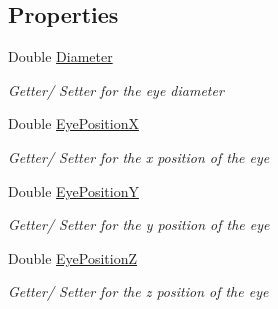 \subsection*{Properties}
\begin{DoxyCompactItemize}
\item 
Double \hyperlink{class_web_analyzer_1_1_models_1_1_data_model_1_1_eye_tracking_data_a52d26b6d84aa2b1fac4dc11e299b69d9}{Diameter}
\begin{DoxyCompactList}\small\item\em Getter/ Setter for the eye diameter \end{DoxyCompactList}\item 
Double \hyperlink{class_web_analyzer_1_1_models_1_1_data_model_1_1_eye_tracking_data_a872295614640947c4599c118311be629}{Eye\+Position\+X}
\begin{DoxyCompactList}\small\item\em Getter/ Setter for the x position of the eye \end{DoxyCompactList}\item 
Double \hyperlink{class_web_analyzer_1_1_models_1_1_data_model_1_1_eye_tracking_data_a4c90dacc2660f530e239c2dca2dddaea}{Eye\+Position\+Y}
\begin{DoxyCompactList}\small\item\em Getter/ Setter for the y position of the eye \end{DoxyCompactList}\item 
Double \hyperlink{class_web_analyzer_1_1_models_1_1_data_model_1_1_eye_tracking_data_a37767ef6afd8e74c124fd0683015b4e5}{Eye\+Position\+Z}
\begin{DoxyCompactList}\small\item\em Getter/ Setter for the z position of the eye \end{DoxyCompactList}\end{DoxyCompactItemize}
